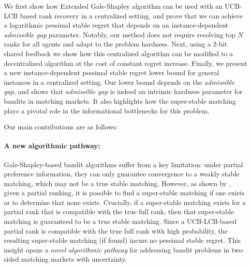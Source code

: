 \documentclass{article}
\begin{document}
We first show how Extended Gale-Shapley algorithm can be used with an UCB-LCB based rank recovery in a centralized setting, and prove that we can achieve a logarithmic pessimal stable regret that depends on an instance-dependent {\em admissible gap} parameter. 
Notably, our method does not require  resolving top $N$ ranks for all agents and adapt to the problem hardness. Next, using a 2-bit shared feedback we show how this centralized algorithm can be modified to a decentralized algorithm at the cost of constant regret increase.  Finally, we present a new instance-dependent pessimal stable regret lower bound for general instances in a centralized setting. Our lower bound depends on the {\em admissible gap}, and shows that {\em admissible gap} is indeed an intrinsic hardness parameter for bandits in matching markets. It also highlights how the super-stable matching plays a pivotal role in the informational bottlenecks for this problem. 

Our main contributions are as follows:
\paragraph{A new algorithmic pathway:} Gale-Shapley-based bandit algorithms suffer from a key limitation: under partial preference information, they can only guarantee convergence to a weakly stable matching, which may not be a true stable matching. However, as shown by \cite{irving1994stable}, given a partial ranking, it is possible to find a super-stable matching if one exists or to determine that none exists.  Crucially, if a super-stable matching exists for a partial rank that is compatible with the true full rank, then that super-stable matching is guaranteed to be a true stable matching.  Since a UCB-LCB-based partial rank is compatible with the true full rank with high probability, the resulting super-stable matching (if found) incurs no pessimal stable regret. This insight opens a {\em novel algorithmic pathway} for addressing bandit problems in two-sided matching markets with uncertainty.
\end{document}
